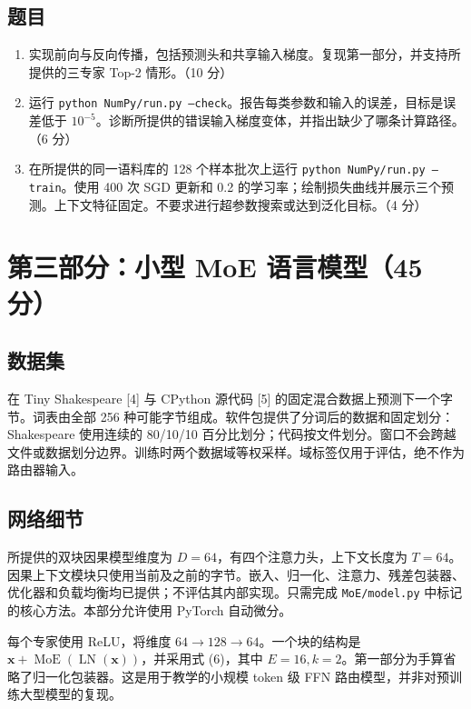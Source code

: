\documentclass[UTF8,11pt,oneside]{ctexart}
\begin{document}
\subsection{题目}
\begin{enumerate}
\item 实现前向与反向传播，包括预测头和共享输入梯度。复现第一部分，并支持所提供的三专家 Top-2 情形。（10 分）
\item 运行 \texttt{python}\allowbreak\ \texttt{NumPy/run.py}\allowbreak\ \texttt{--check}。报告每类参数和输入的误差，目标是误差低于 $10^{-5}$。诊断所提供的错误输入梯度变体，并指出缺少了哪条计算路径。（6 分）
\item 在所提供的同一语料库的 128 个样本批次上运行 \texttt{python}\allowbreak\ \texttt{NumPy/run.py}\allowbreak\ \texttt{--train}。使用 400 次 SGD 更新和 0.2 的学习率；绘制损失曲线并展示三个预测。上下文特征固定。不要求进行超参数搜索或达到泛化目标。（4 分）
\end{enumerate}

\section{第三部分：小型 MoE 语言模型（45 分）}
\subsection{数据集}
在 Tiny Shakespeare [4] 与 CPython 源代码 [5] 的固定混合数据上预测下一个字节。词表由全部 256 种可能字节组成。软件包提供了分词后的数据和固定划分：Shakespeare 使用连续的 80/10/10 百分比划分；代码按文件划分。窗口不会跨越文件或数据划分边界。训练时两个数据域等权采样。域标签仅用于评估，绝不作为路由器输入。
\subsection{网络细节}
所提供的双块因果模型维度为 $D=64$，有四个注意力头，上下文长度为 $T=64$。因果上下文模块只使用当前及之前的字节。嵌入、归一化、注意力、残差包装器、优化器和负载均衡均已提供；不评估其内部实现。只需完成 \texttt{MoE/model.py} 中标记的核心方法。本部分允许使用 PyTorch 自动微分。

每个专家使用 ReLU，将维度 $64\to128\to64$。一个块的结构是 $\bm{x}+\operatorname{MoE}(\operatorname{LN}(\bm{x}))$，并采用式 (6)，其中 $E=16,k=2$。第一部分为手算省略了归一化包装器。这是用于教学的小规模 token 级 FFN 路由模型，并非对预训练大型模型的复现。
\end{document}
